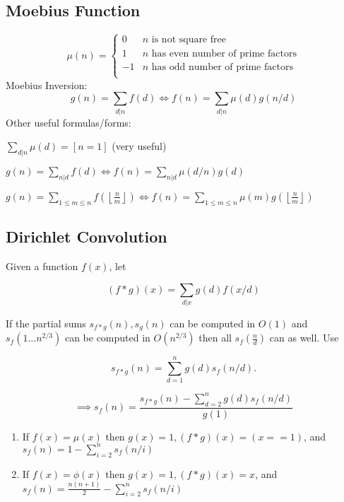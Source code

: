 \subsection{Moebius Function}
\[
	\mu(n) = \begin{cases} 0 & n \textrm{ is not square free}\\ 1 & n \textrm{ has even number of prime factors}\\ -1 & n \textrm{ has odd number of prime factors}\\\end{cases}
\]
  Moebius Inversion:
  \[ g(n) = \sum_{d|n} f(d) \Leftrightarrow f(n) = \sum_{d|n} \mu(d)g(n/d) \]
  Other useful formulas/forms:

  $ \sum_{d | n} \mu(d) = [ n = 1] $ (very useful)

  $ g(n) = \sum_{n|d} f(d) \Leftrightarrow f(n) = \sum_{n|d} \mu(d/n)g(d)$

 $ g(n) = \sum_{1 \leq m \leq n} f(\left\lfloor\frac{n}{m}\right \rfloor ) \Leftrightarrow f(n) = \sum_{1\leq m\leq n} \mu(m)g(\left\lfloor\frac{n}{m}\right\rfloor)$


\subsection{Dirichlet Convolution} Given a function $f(x)$, let 

	$$(f*g)(x)=\sum_{d|x}g(d)f(x/d)$$

	If the partial sums $s_{f*g}(n),s_g(n)$ can be computed in $O(1)$ and $s_f(1\ldots n^{2/3})$ can be computed in $O\left(n^{2/3}\right)$ then all $s_f\left(\frac{n}{d}\right)$ can as well. Use

	$$s_{f*g}(n)=\sum_{d=1}^ng(d)s_f(n/d).$$ 

	 $$\implies s_f(n)=\frac{s_{f*g}(n)-\sum_{d=2}^ng(d)s_f(n/d)}{g(1)}$$
	\begin{enumerate}
	 \item If $f(x)=\mu(x)$ then $g(x)=1, (f*g)(x)=(x == 1)$, and $s_f(n)=1-\sum_{i=2}^ns_f(n/i)$\\

	 \item If $f(x)=\phi(x)$ then $g(x)=1, (f*g)(x)=x$, and $s_f(n)=\frac{n(n+1)}{2}-\sum_{i=2}^ns_f(n/i)$
  \end{enumerate}

